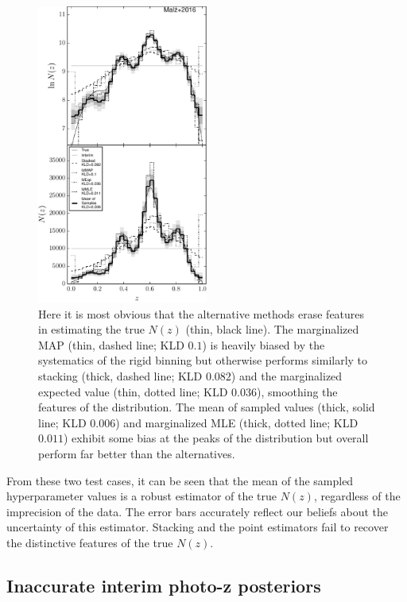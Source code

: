 \documentclass[preprint]{aastex}
\begin{document}
\begin{figure}
\includegraphics[width=0.5\textwidth]{figs/sig4/comps.pdf}
\caption{Here it is most obvious that the alternative methods erase features in 
estimating the true $N(z)$ (thin, black line).  The marginalized MAP (thin, 
dashed line; KLD $0.1$) is heavily biased by the systematics of the rigid 
binning but otherwise performs similarly to stacking (thick, dashed line; KLD 
$0.082$) and the marginalized expected value (thin, dotted line; KLD $0.036$), 
smoothing the features of the distribution.  The mean of sampled values (thick, 
solid line; KLD $0.006$) and marginalized MLE (thick, dotted line; KLD $0.011$) 
exhibit some bias at the peaks of the distribution but overall perform far 
better than the alternatives.}
\label{fig:sig4-comp}
\end{figure}

From these two test cases, it can be seen that the mean of the sampled 
hyperparameter values is a robust estimator of the true $N(z)$, regardless of 
the imprecision of the data.  The error bars accurately reflect our beliefs 
about the uncertainty of this estimator.  Stacking and the point estimators 
fail to recover the distinctive features of the true $N(z)$.

\clearpage
\subsection{Inaccurate interim photo-z posteriors}
\label{sec:multi}
\end{document}

